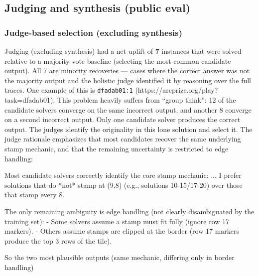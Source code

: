 \documentclass[11pt]{article}
\newenvironment{Shaded}{}{}
\newcommand{\NormalTok}[1]{#1}
\begin{document}
\hypertarget{judging-and-synthesis-public-eval}{%
\subsection{Judging and synthesis (public
eval)}\label{judging-and-synthesis-public-eval}}

\hypertarget{judge-based-selection-excluding-synthesis}{%
\subsubsection{Judge-based selection (excluding
synthesis)}\label{judge-based-selection-excluding-synthesis}}

Judging (excluding synthesis) had a net uplift of \textbf{7} instances
that were solved relative to a majority-vote baseline (selecting the
most common candidate output). All 7 are minority recoveries --- cases
where the correct answer was not the majority output and the holistic
judge identified it by reasoning over the full traces. One example of
this is \texttt{dfadab01:1} (https://arcprize.org/play?task=dfadab01).
This problem heavily suffers from ``group think'': 12 of the candidate
solvers converge on the same incorrect output, and another 8 converge on
a second incorrect output. Only one candidate solver produces the
correct output. The judges identify the originality in this lone
solution and select it. The judge rationale emphasizes that most
candidates recover the same underlying stamp mechanic, and that the
remaining uncertainty is restricted to edge handling:

\begin{Shaded}
\begin{Highlighting}[]
\NormalTok{Most candidate solvers correctly identify the}
\NormalTok{core stamp mechanic:}
\NormalTok{...}
\NormalTok{I prefer solutions that do *not* stamp at (9,8)}
\NormalTok{(e.g., solutions 10{-}15/17{-}20) over those that}
\NormalTok{stamp every 8.}

\NormalTok{The only remaining ambiguity is edge handling}
\NormalTok{(not clearly disambiguated by the training set):}
\NormalTok{{-} Some solvers assume a stamp must fit fully}
\NormalTok{  (ignore row 17 markers).}
\NormalTok{{-} Others assume stamps are clipped at the border}
\NormalTok{  (row 17 markers produce the top 3 rows of}
\NormalTok{  the tile).}

\NormalTok{So the two most plausible outputs}
\NormalTok{(same mechanic, differing only in border handling)}
\end{Highlighting}
\end{Shaded}
\end{document}
